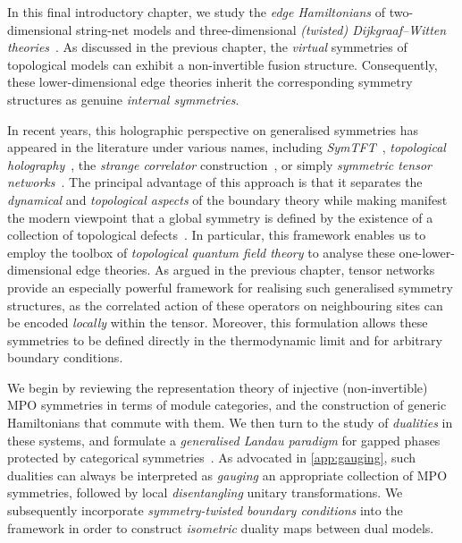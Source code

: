 In this final introductory chapter, we study the \emph{edge Hamiltonians} of two-dimensional string-net models and three-dimensional \emph{(twisted) Dijkgraaf–Witten theories}~\cite{Dijkgraaf1989,Wakui1992}. As discussed in the previous chapter, the \emph{virtual} symmetries of topological models can exhibit a non-invertible fusion structure. Consequently, these lower-dimensional edge theories inherit the corresponding symmetry structures as genuine \emph{internal symmetries}.

In recent years, this holographic perspective on generalised symmetries has appeared in the literature under various names, including \emph{SymTFT}~\cite{Apruzzi2021,Kaidi2022,Kaidi2023}, \emph{topological holography}~\cite{Chatterjee2022b,Ji2019,Ji2021}, the \emph{strange correlator} construction~\cite{You2013,Vanhove2018,Delcamp2024}, or simply \emph{symmetric tensor networks}~\cite{Singh2009,Devos2025}. The principal advantage of this approach is that it separates the \emph{dynamical} and \emph{topological aspects} of the boundary theory while making manifest the modern viewpoint that a global symmetry is defined by the existence of a collection of topological defects~\cite{Fendley2020,Gaiotto2014,Freed2022}. In particular, this framework enables us to employ the toolbox of \emph{topological quantum field theory} to analyse these one-lower-dimensional edge theories. As argued in the previous chapter, tensor networks provide an especially powerful framework for realising such generalised symmetry structures, as the correlated action of these operators on neighbouring sites can be encoded \emph{locally} within the tensor. Moreover, this formulation allows these symmetries to be defined directly in the thermodynamic limit and for arbitrary boundary conditions.

We begin by reviewing the representation theory of injective (non-invertible) MPO symmetries in terms of module categories, and the construction of generic Hamiltonians that commute with them. We then turn to the study of \emph{dualities} in these systems, and formulate a \emph{generalised Landau paradigm} for gapped phases protected by categorical symmetries~\cite{Thorngren2019,GarreRubio2022,Bhardwaj2023,Lootens2024,Chen2025}. As advocated in \cref{app:gauging}, such dualities can always be interpreted as \emph{gauging} an appropriate collection of MPO symmetries, followed by local \emph{disentangling} unitary transformations. We subsequently incorporate \emph{symmetry-twisted boundary conditions} into the framework in order to construct \emph{isometric} duality maps between dual models.

